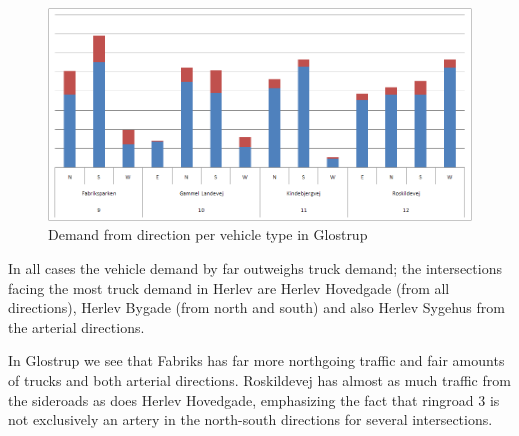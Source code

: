 \begin{figure}[ht]
\centering
\includegraphics[scale=0.30]{demand_from_direction_per_intersection_glostrup.png}
\caption{Demand from direction per vehicle type in Glostrup}
\label{fig:insect_glostrup}
\end{figure}

In all cases the vehicle demand by far outweighs truck demand; the intersections facing the most truck demand in Herlev are Herlev Hovedgade (from all directions), Herlev Bygade (from north and south) and also Herlev Sygehus from the arterial directions. 

In Glostrup we see that Fabriks has far more northgoing traffic and fair amounts of trucks and both arterial directions. Roskildevej has almost as much traffic from the sideroads as does Herlev Hovedgade, emphasizing the fact that ringroad 3 is not exclusively an artery in the north-south directions for several intersections.
